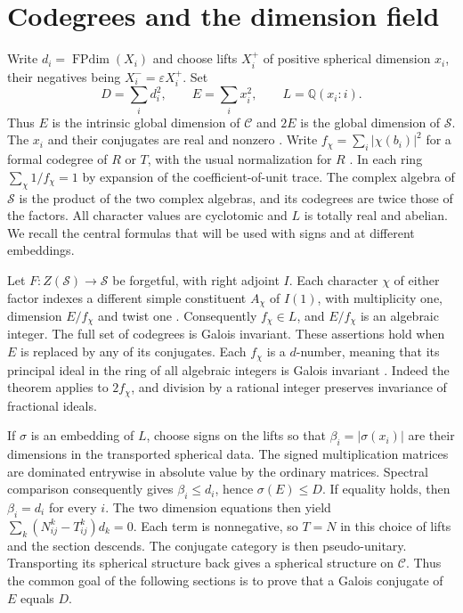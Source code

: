 \documentclass[11pt,a4paper]{article}
\numberwithin{equation}{section}
\begin{document}
\section{Codegrees and the dimension field}\label{sec:central}
Write $d_i=\operatorname{FPdim}(X_i)$ and choose lifts $X_i^+$ of positive
spherical dimension $x_i$, their negatives being $X_i^-=\varepsilon X_i^+$.
Set
\[
 D=\sum_i d_i^2,\qquad E=\sum_i x_i^2,\qquad L=\mathbb Q(x_i:i).
\]
Thus $E$ is the intrinsic global dimension of $\mathcal C$ and $2E$ is the
global dimension of $\mathcal S$. The $x_i$ and their conjugates are real
and nonzero \cite[Corollary~2.10]{ENO}. Write $f_\chi=\sum_i|\chi(b_i)|^2$ for a formal codegree of
$R$ or $T$, with the usual normalization for $R$
\cite[Section~2.2]{OstrikCodegrees}. In each ring $\sum_\chi 1/f_\chi=1$ by expansion of the
coefficient-of-unit trace. The complex algebra of $\mathcal S$ is the
product of the two complex algebras, and its codegrees are twice those of
the factors. All character values are cyclotomic \cite[Corollary~8.53]{ENO} and $L$ is
totally real and abelian. We recall the central formulas that will be used
with signs and at different embeddings.

Let $F:Z(\mathcal S)\longrightarrow\mathcal S$ be forgetful, with right
adjoint $I$. Each character $\chi$ of either factor indexes a different
simple constituent $A_\chi$ of $I(1)$, with multiplicity one, dimension
$E/f_\chi$ and twist one \cite[Theorems 2.5 and 2.13]{Ostrik3}.
Consequently $f_\chi\in L$, and $E/f_\chi$ is an algebraic integer.
The full set of codegrees is Galois invariant. These assertions hold
when $E$ is replaced by any of its conjugates. Each $f_\chi$ is a
$d$-number, meaning that its principal ideal in the ring of all algebraic
integers is Galois invariant \cite[Theorem~1.2]{OstrikCodegrees}. Indeed the theorem
applies to $2f_\chi$, and division by a rational integer preserves
invariance of fractional ideals.

If $\sigma$ is an embedding of $L$, choose signs on the lifts so that
$\beta_i=|\sigma(x_i)|$ are their dimensions in the transported spherical
data. The signed multiplication matrices are dominated entrywise in
absolute value by the ordinary matrices. Spectral comparison consequently
gives $\beta_i\le d_i$, hence $\sigma(E)\le D$. If equality holds, then
$\beta_i=d_i$ for every $i$. The two dimension equations then yield
$\sum_k(N_{ij}^k-T_{ij}^k)d_k=0$. Each term is nonnegative, so $T=N$
in this choice of lifts and the section descends. The conjugate category is then pseudo-unitary. Transporting its spherical
structure back gives a spherical structure on $\mathcal C$.
Thus the common goal of the following sections is to prove that a Galois
conjugate of $E$ equals $D$.
\end{document}
